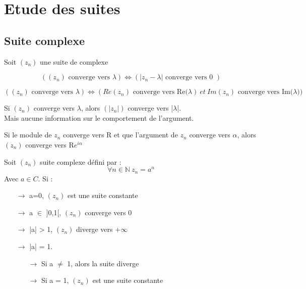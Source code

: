 \chapter{Etude des suites}
\section{Suite complexe}
Soit $(z_n)$ une suite de complexe
\begin{prop}
$$((z_n)\mbox{ converge vers }\lambda ) \Leftrightarrow (|z_n - \lambda| \mbox{ converge vers 0 })$$
\end{prop}
\begin{prop}
$$((z_n)\mbox{ converge vers }\lambda ) \Leftrightarrow (Re(z_n) \mbox{ converge vers Re(}\lambda)~ et~ Im(z_n) \mbox{ converge vers Im(}\lambda))$$
\end{prop}
\begin{prop}
Si $(z_n)$ converge vers $\lambda$, alors $(|z_n|)$ converge vers |$\lambda$|.\\
Mais aucune information sur le comportement de l'argument.
\end{prop}
\begin{prop}
Si le module de $z_n$ converge vers R et que l'argument de $z_n$ converge vers $\alpha$, alors $(z_n)$ converge vers R$e^{i\alpha}$
\end{prop}
\begin{prop}
Soit $(z_n)$ suite complexe défini par :
$$\forall n \in \mathbb{N}~ z_n = a^n$$
Avec $a \in C$.
Si :
\begin{itemize}
 \item[$\rightarrow$] a=0, $(z_n)$ est une suite constante\\
 \item[$\rightarrow$] a $\in$ ]0,1[, $(z_n)$ converge vers 0\\
 \item[$\rightarrow$] |a| > 1, $(z_n)$ diverge vers $+\infty$\\
 \item[$\rightarrow$] |a| = 1.\\ \begin{itemize}
 \item[$\rightarrow$] Si a $\neq$ 1, alors la suite diverge\\
 \item[$\rightarrow$] Si a = 1, $(z_n)$ est une suite constante\\
\end{itemize}
\end{itemize}
\end{prop}
